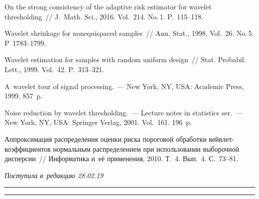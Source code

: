 \begin{multicols}{2}
{{\begin{thebibliography}{99}
 On the strong consistency of the adaptive risk estimator for
 wavelet thresholding~// J.~Math. Sci., 2016. Vol.~214. No.\,1. P.~115--118.

 Wavelet shrinkage for nonequispaced samples~// 
Ann. Stat., 1998. Vol.~26. No.\,5. P~1783--1799.

 Wavelet estimation for samples with random uniform design~// 
Stat. Probabil. Lett., 1999. Vol.~42. P.~313--321.

 A~wavelet tour of signal processing.~--- 
New York, NY, USA: Academic Press, 1999. 857~p.

 Noise reduction by wavelet thresholding.~--- 
Lecture notes in statistics ser.~--- New York, NY, USA: Springer Verlag, 2001. Vol.~161. 196~p.

 Аппроксимация распределения оценки риска 
пороговой обработки вейв\-лет-ко\-эф\-фи\-ци\-ен\-тов 
нормальным распределением при использовании выборочной дисперсии~// Информатика и~её 
применения, 2010. Т.~4. Вып.~4. С.~73--81.
 \end{thebibliography}

 }
 }

\end{multicols}

\vspace*{-3pt}

\hfill{\small\textit{Поступила в~редакцию 28.02.19}}

\vspace*{8pt}




\hrule

\vspace*{2pt}

\hrule


\def\tit{PROPERTIES OF WAVELET ESTIMATES OF~SIGNALS RECORDED AT~RANDOM TIME POINTS}


\def\titkol{Properties of wavelet estimates of~signals recorded at~random time points}

\def\aut{O.\,V.~Shestakov$^{1,2}$}

\def\autkol{O.\,V.~Shestakov}

